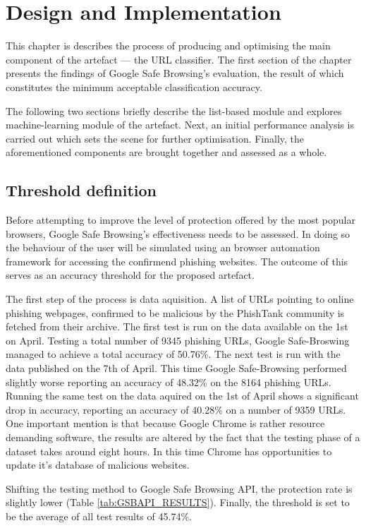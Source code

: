 
\chapter{Design and Implementation}
This chapter is describes the process of producing and optimising the main component of the artefact --- the URL classifier. The first section of the chapter presents the findings of Google Safe Browsing's evaluation, the result of which constitutes the minimum acceptable classification accuracy.

The following two sections briefly describe the list-based module and explores machine-learning module of the artefact. Next, an initial performance analysis is carried out which sets the scene for further optimisation. Finally, the aforementioned components are brought together and assessed as a whole.

\section{Threshold definition}
Before attempting to improve the level of protection offered by the most popular browsers, Google Safe Browsing's effectiveness needs to be assessed. In doing so the behaviour of the user will be simulated using an browser automation framework for accessing the confirmend phishing websites. The outcome of this serves as an accuracy threshold for the proposed artefact.

The first step of the process is data aquisition. A list of URLs pointing to online phishing webpages, confirmed to be malicious by the PhishTank community is fetched from their archive. The first test is run on the data available on the 1st on April. Testing a total number of 9345 phishing URLs, Google Safe-Broswing managed to achieve a total accuracy of 50.76\%.
The next test is run with the data published on the 7th of April. This time Google Safe-Browsing performed slightly worse reporting an accuracy of 48.32\% on the 8164 phishing URLs. Running the same test on the data aquired on the 1st of April shows a significant drop in accuracy, reporting an accuracy of 40.28\% on a number of 9359 URLs.
One important mention is that because Google Chrome is rather resource demanding software, the results are altered by the fact that the testing phase of a dataset takes around eight hours. In this time Chrome has opportunities to update it's database of malicious websites.

Shifting the testing method to Google Safe Browsing API, the protection rate is slightly lower (Table \ref{tab:GSBAPI_RESULTS}). Finally, the threshold is set to be the average of all test results of 45.74\%.


